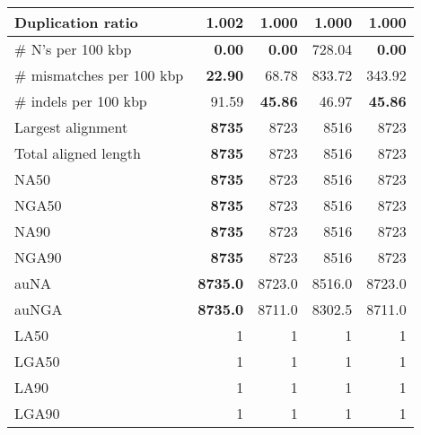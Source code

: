 \documentclass[12pt,a4paper]{article}
\begin{document}
\begin{table}[ht]
\begin{center}
\begin{tabular}{|l*{4}{|r}|}
Duplication ratio & 1.002 & {\bf 1.000} & {\bf 1.000} & {\bf 1.000} \\ \hline
\# N's per 100 kbp & {\bf 0.00} & {\bf 0.00} & 728.04 & {\bf 0.00} \\ \hline
\# mismatches per 100 kbp & {\bf 22.90} & 68.78 & 833.72 & 343.92 \\ \hline
\# indels per 100 kbp & 91.59 & {\bf 45.86} & 46.97 & {\bf 45.86} \\ \hline
Largest alignment & {\bf 8735} & 8723 & 8516 & 8723 \\ \hline
Total aligned length & {\bf 8735} & 8723 & 8516 & 8723 \\ \hline
NA50 & {\bf 8735} & 8723 & 8516 & 8723 \\ \hline
NGA50 & {\bf 8735} & 8723 & 8516 & 8723 \\ \hline
NA90 & {\bf 8735} & 8723 & 8516 & 8723 \\ \hline
NGA90 & {\bf 8735} & 8723 & 8516 & 8723 \\ \hline
auNA & {\bf 8735.0} & 8723.0 & 8516.0 & 8723.0 \\ \hline
auNGA & {\bf 8735.0} & 8711.0 & 8302.5 & 8711.0 \\ \hline
LA50 & 1 & 1 & 1 & 1 \\ \hline
LGA50 & 1 & 1 & 1 & 1 \\ \hline
LA90 & 1 & 1 & 1 & 1 \\ \hline
LGA90 & 1 & 1 & 1 & 1 \\ \hline
\end{tabular}
\end{center}
\end{table}
\end{document}
